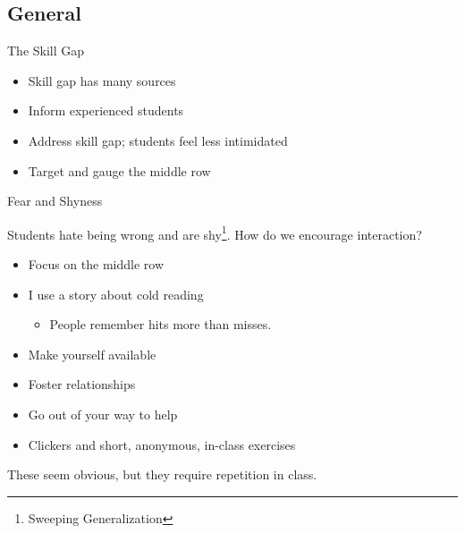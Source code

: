 \documentclass[11pt]{beamer}
\begin{document}
\subsection{General}

\begin{frame}{The Skill Gap}
	\begin{itemize}
		\item Skill gap has many sources
		\item Inform experienced students
		\item Address skill gap; students feel less intimidated
		\item Target and gauge the middle row
	\end{itemize}
\end{frame}



\begin{frame}{Fear and Shyness}
	
	Students hate being wrong and are shy\footnote{Sweeping Generalization}.  How do we encourage interaction?
	\pause
	\begin{itemize}
		\item Focus on the middle row
		\pause
		
		\item I use a story about cold reading
		\begin{itemize}
			\item People remember hits more than misses.
		\end{itemize}
		\pause
		
		\item Make yourself available 
		\pause
		
		\item Foster relationships
		\pause
		
		\item Go out of your way to help
		\pause
		\item Clickers and short, anonymous, in-class exercises
	\end{itemize}
	\pause
	These seem obvious, but they require repetition in class.
\end{frame}
\end{document}
